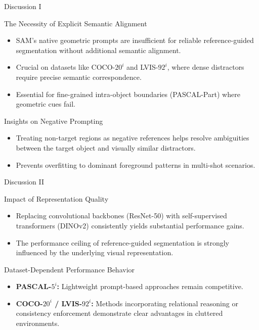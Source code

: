 \documentclass[aspectratio=169, 10pt]{beamer}
\begin{document}
\begin{frame}{Discussion I}
    \begin{block}{The Necessity of Explicit Semantic Alignment}
        \footnotesize
        \begin{itemize}
            \item SAM’s native geometric prompts are insufficient for reliable reference-guided segmentation without additional semantic alignment.
            \item Crucial on datasets like COCO-$20^i$ and LVIS-$92^i$, where dense distractors require precise semantic correspondence.
            \item Essential for fine-grained intra-object boundaries (PASCAL-Part) where geometric cues fail.
        \end{itemize}
    \end{block}

    \begin{block}{Insights on Negative Prompting}
        \footnotesize
        \begin{itemize}
            \item Treating non-target regions as negative references helps resolve ambiguities between the target object and visually similar distractors.
            \item Prevents overfitting to dominant foreground patterns in multi-shot scenarios.
        \end{itemize}
    \end{block}
\end{frame}

\begin{frame}{Discussion II}
    \begin{block}{Impact of Representation Quality}
        \footnotesize
        \begin{itemize}
            \item Replacing convolutional backbones (ResNet-50) with self-supervised transformers (DINOv2) consistently yields substantial performance gains.
            \item The performance ceiling of reference-guided segmentation is strongly influenced by the underlying visual representation.
        \end{itemize}
    \end{block}

    \begin{block}{Dataset-Dependent Performance Behavior}
        \footnotesize
        \begin{itemize}
            \item \textbf{PASCAL-$5^i$:} Lightweight prompt-based approaches remain competitive.
            \item \textbf{COCO-$20^i$ / LVIS-$92^i$:} Methods incorporating relational reasoning or consistency enforcement demonstrate clear advantages in cluttered environments.
        \end{itemize}
    \end{block}
\end{frame}
\end{document}
